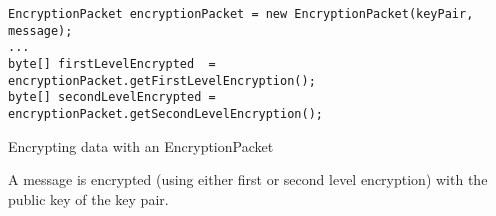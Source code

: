 \begin{listing}[H]
  \centering
  \begin{verbatim}
EncryptionPacket encryptionPacket = new EncryptionPacket(keyPair, message);
...
byte[] firstLevelEncrypted  = encryptionPacket.getFirstLevelEncryption();
byte[] secondLevelEncrypted = encryptionPacket.getSecondLevelEncryption();
  \end{verbatim}
  \caption{
    Encrypting data with an EncryptionPacket
  }{
  	A message is encrypted (using either first or second level encryption) with the public key of the key pair.
  }
  \label{code:encryption_packet_encryption}
\end{listing}
